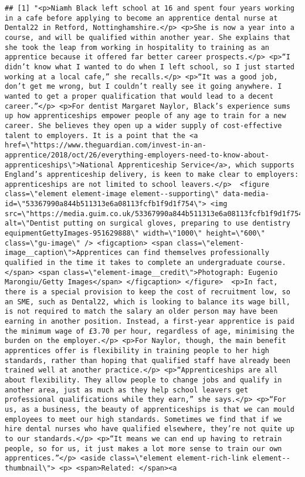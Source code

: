 \documentclass[]{article}
\begin{document}
\begin{verbatim}
## [1] "<p>Niamh Black left school at 16 and spent four years working in a cafe before applying to become an apprentice dental nurse at Dental22 in Retford, Nottinghamshire.</p> <p>She is now a year into a course, and will be qualified within another year. She explains that she took the leap from working in hospitality to training as an apprentice because it offered far better career prospects.</p> <p>“I didn’t know what I wanted to do when I left school, so I just started working at a local cafe,” she recalls.</p> <p>“It was a good job, don’t get me wrong, but I couldn’t really see it going anywhere. I wanted to get a proper qualification that would lead to a decent career.”</p> <p>For dentist Margaret Naylor, Black’s experience sums up how apprenticeships empower people of any age to train for a new career. She believes they open up a wider supply of cost-effective talent to employers. It is a point that the <a href=\"https://www.theguardian.com/invest-in-an-apprentice/2018/oct/26/everything-employers-need-to-know-about-apprenticeships\">National Apprenticeship Service</a>, which supports England’s apprenticeship delivery, is keen to make clear to employers: apprenticeships are not limited to school leavers.</p>  <figure class=\"element element-image element--supporting\" data-media-id=\"53367990a844b511313e6a08113fcfb1f9d1f754\"> <img src=\"https://media.guim.co.uk/53367990a844b511313e6a08113fcfb1f9d1f754/0_0_5600_3360/1000.jpg\" alt=\"Dentist putting on surgical gloves, preparing to use dentistry equipmentGettyImages-951629888\" width=\"1000\" height=\"600\" class=\"gu-image\" /> <figcaption> <span class=\"element-image__caption\">Apprentices can find themselves professionally qualified in the time it takes to complete an undergraduate course.</span> <span class=\"element-image__credit\">Photograph: Eugenio Marongiu/Getty Images</span> </figcaption> </figure>  <p>In fact, there is a special provision to keep the cost of recruitment low, so an SME, such as Dental22, which is looking to balance its wage bill, is not required to match the salary an older person may have been earning in another position. Instead, a first-year apprentice is paid the minimum wage of £3.70 per hour, regardless of age, minimising the burden on the employer.</p> <p>For Naylor, though, the main benefit apprentices offer is flexibility in training people to her high standards, rather than hoping that qualified staff have already been trained well at another practice.</p> <p>“Apprenticeships are all about flexibility. They allow people to change jobs and qualify in another area, just as much as they help school leavers get professional qualifications while they earn,” she says.</p> <p>“For us, as a business, the beauty of apprenticeships is that we can mould employees to meet our high standards. Sometimes we find that if we hire dental nurses who have qualified elsewhere, they’re not quite up to our standards.</p> <p>“It means we can end up having to retrain people, so for us, it just makes a lot more sense to train our own apprentices.”</p> <aside class=\"element element-rich-link element--thumbnail\"> <p> <span>Related: </span><a 
\end{verbatim}
\end{document}
